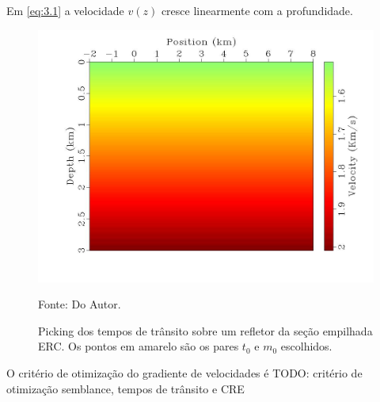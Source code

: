 Em \ref{eq:3.1} a velocidade $v(z)$ cresce linearmente com a profundidade.

\begin{figure}[H]
\caption{Picking dos tempos de trânsito sobre um refletor da seção empilhada ERC. Os pontos
em amarelo são os pares $t_0$ e $m_0$ escolhidos.}
\begin{center}
\includegraphics[scale=0.3]{images/gzvel.jpeg}
\vspace{-0.3cm}
\end{center}
\begin{center}
 Fonte: Do Autor.
\end{center}
\label{fig:3.2}
\end{figure}


O critério de otimização do gradiente de velocidades é 
TODO: critério de otimização semblance, tempos de trânsito e CRE



